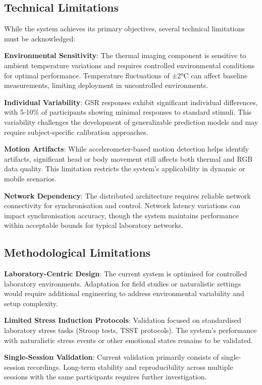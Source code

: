 \subsection{Technical Limitations}

While the system achieves its primary objectives, several technical limitations must be acknowledged:

\textbf{Environmental Sensitivity}: The thermal imaging component is sensitive to ambient temperature variations and requires controlled environmental conditions for optimal performance. Temperature fluctuations of ±2°C can affect baseline measurements, limiting deployment in uncontrolled environments.

\textbf{Individual Variability}: GSR responses exhibit significant individual differences, with 5-10\% of participants showing minimal responses to standard stimuli. This variability challenges the development of generalizable prediction models and may require subject-specific calibration approaches.

\textbf{Motion Artifacts}: While accelerometer-based motion detection helps identify artifacts, significant head or body movement still affects both thermal and RGB data quality. This limitation restricts the system's applicability in dynamic or mobile scenarios.

\textbf{Network Dependency}: The distributed architecture requires reliable network connectivity for synchronisation and control. Network latency variations can impact synchronisation accuracy, though the system maintains performance within acceptable bounds for typical laboratory networks.

\subsection{Methodological Limitations}

\textbf{Laboratory-Centric Design}: The current system is optimised for controlled laboratory environments. Adaptation for field studies or naturalistic settings would require additional engineering to address environmental variability and setup complexity.

\textbf{Limited Stress Induction Protocols}: Validation focused on standardised laboratory stress tasks (Stroop tests, TSST protocols). The system's performance with naturalistic stress events or other emotional states remains to be validated.

\textbf{Single-Session Validation}: Current validation primarily consists of single-session recordings. Long-term stability and reproducibility across multiple sessions with the same participants requires further investigation.

